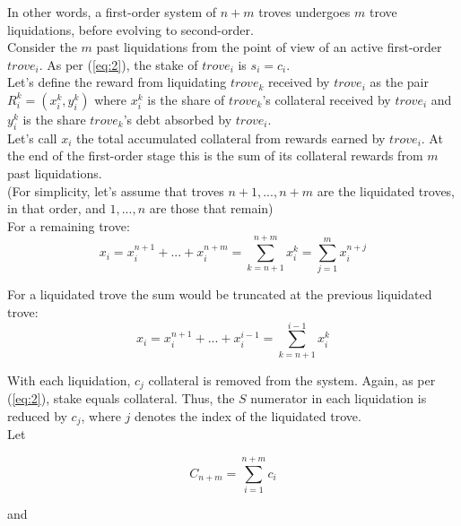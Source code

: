 \documentclass[reqno]{article}
\begin{document}
\bigskip
In other words, a first-order system of $n+m$ troves undergoes $m$ trove liquidations, before evolving to second-order.\\

Consider the $m$ past liquidations from the point of view of an active first-order $trove_i$. As per (\ref{eq:2}), the stake of $trove_i$ is $s_i = c_i$.\\

Let’s define the reward from liquidating $trove_k$ received by $trove_i$ as the pair $R_i^k = (x_i^k, y_i^k)$ where $x_i^k$ is the share of $trove_k$’s collateral received by $trove_i$ and $y_i^k$ is the share $trove_k$’s debt absorbed by $trove_i$.\\

Let’s call $x_i$ the total accumulated collateral from rewards earned by $trove_i$. At the end of the first-order stage this is the sum of its collateral rewards from $m$ past liquidations.\\

(For simplicity, let’s assume that troves $n+1, ..., n+m$ are the liquidated troves, in that order, and $1, ..., n$ are those that remain)\\

For a remaining trove:\\

\begin{equation} \label{eq:collreward}
  x_i = x_i^{n+1} + ... + x_i^{n+m} = \sum_{k=n+1}^{n+m}x_i^k = \sum_{j=1}^{m}x_i^{n+j}
\end{equation}

For a liquidated trove the sum would be truncated at the previous liquidated trove: \\

\begin{equation}
  x_i = x_i^{n+1} + ... + x_i^{i-1} = \sum_{k=n+1}^{i-1}x_i^k
\end{equation}

With each liquidation, $c_j$ collateral is removed from the system. Again, as per (\ref{eq:2}), stake equals collateral. Thus, the $S$ numerator in each liquidation is reduced by $c_j$, where $j$ denotes the index of the liquidated trove.\\ 


Let

\begin{equation} 
    C_{n+m}=\sum\limits^{n+m}_{i=1}c_i
\end{equation}

\bigskip
and
\end{document}
